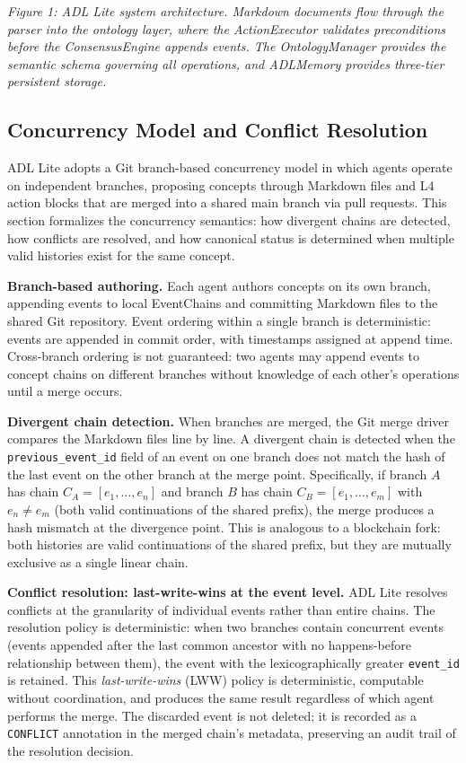 \emph{Figure 1: ADL Lite system architecture. Markdown documents flow through the parser into the ontology layer, where the ActionExecutor validates preconditions before the ConsensusEngine appends events. The OntologyManager provides the semantic schema governing all operations, and ADLMemory provides three-tier persistent storage.}

\subsection{Concurrency Model and Conflict Resolution}\label{concurrency-model-and-conflict-resolution}

ADL Lite adopts a Git branch-based concurrency model in which agents operate on independent branches, proposing concepts through Markdown files and L4 action blocks that are merged into a shared main branch via pull requests. This section formalizes the concurrency semantics: how divergent chains are detected, how conflicts are resolved, and how canonical status is determined when multiple valid histories exist for the same concept.

\textbf{Branch-based authoring.} Each agent authors concepts on its own branch, appending events to local EventChains and committing Markdown files to the shared Git repository. Event ordering within a single branch is deterministic: events are appended in commit order, with timestamps assigned at append time. Cross-branch ordering is not guaranteed: two agents may append events to concept chains on different branches without knowledge of each other's operations until a merge occurs.

\textbf{Divergent chain detection.} When branches are merged, the Git merge driver compares the Markdown files line by line. A divergent chain is detected when the \texttt{previous\_event\_id} field of an event on one branch does not match the hash of the last event on the other branch at the merge point. Specifically, if branch \(A\) has chain \(C_A = [e_1, \ldots, e_n]\) and branch \(B\) has chain \(C_B = [e_1, \ldots, e_m]\) with \(e_n \neq e_m\) (both valid continuations of the shared prefix), the merge produces a hash mismatch at the divergence point. This is analogous to a blockchain fork: both histories are valid continuations of the shared prefix, but they are mutually exclusive as a single linear chain.

\textbf{Conflict resolution: last-write-wins at the event level.} ADL Lite resolves conflicts at the granularity of individual events rather than entire chains. The resolution policy is deterministic: when two branches contain concurrent events (events appended after the last common ancestor with no happens-before relationship between them), the event with the lexicographically greater \texttt{event\_id} is retained. This \emph{last-write-wins} (LWW) policy is deterministic, computable without coordination, and produces the same result regardless of which agent performs the merge. The discarded event is not deleted; it is recorded as a \texttt{CONFLICT} annotation in the merged chain's metadata, preserving an audit trail of the resolution decision.

